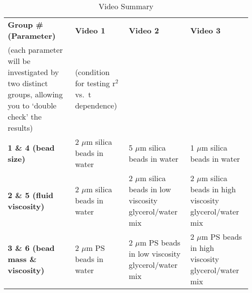 \begin{table}[!t]
\centering
\caption{Video Summary}
\label{tab:exp3video}
\begin{tabular}{|p{4.5cm}|p{3cm}|p{3cm}|p{3cm}|}
\hline
 \textbf{Group \# (Parameter)} & \textbf{Video 1} & \textbf{Video 2} & \textbf{Video 3}  \\
 (each parameter will be investigated by two distinct groups, allowing you to `double check' the results) & (condition for testing r$^2$ vs.\ t dependence) &  & \\ \hline
 \textbf{1 \& 4 (bead size)} & 2 $\mu$m silica beads in water & 5 $\mu$m silica beads in water & 1 $\mu$m silica beads in water \\ \hline
 \textbf{2 \& 5 (fluid viscosity)} & 2 $\mu$m silica beads in water & 2 $\mu$m silica beads in low viscosity glycerol/water mix & 2 $\mu$m silica beads in high viscosity glycerol/water mix \\ \hline
 \textbf{3 \& 6 (bead mass \& viscosity)} & 2 $\mu$m PS beads in water & 2 $\mu$m PS beads in low viscosity glycerol/water mix & 2 $\mu$m PS beads in high viscosity glycerol/water mix \\ \hline
\end{tabular}
\end{table}

